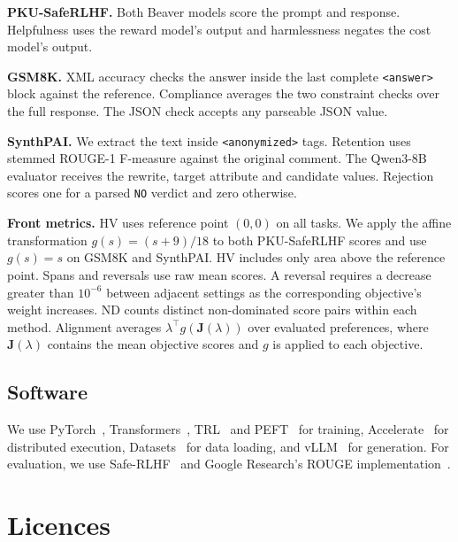 \documentclass{article} %
\begin{document}
\textbf{PKU-SafeRLHF.} Both Beaver models score the prompt and response. Helpfulness uses the reward model's output and harmlessness negates the cost model's output.

\textbf{GSM8K.} XML accuracy checks the answer inside the last complete \texttt{<answer>} block against the reference. Compliance averages the two constraint checks over the full response. The JSON check accepts any parseable JSON value.

\textbf{SynthPAI.} We extract the text inside \texttt{<anonymized>} tags. Retention uses stemmed ROUGE-1 F-measure against the original comment. The Qwen3-8B evaluator receives the rewrite, target attribute and candidate values. Rejection scores one for a parsed \texttt{NO} verdict and zero otherwise. 

\textbf{Front metrics.} HV uses reference point $(0,0)$ on all tasks. We apply the affine transformation $g(s)=(s+9)/18$ to both PKU-SafeRLHF scores and use $g(s)=s$ on GSM8K and SynthPAI. HV includes only area above the reference point. Spans and reversals use raw mean scores. A reversal requires a decrease greater than $10^{-6}$ between adjacent settings as the corresponding objective's weight increases. ND counts distinct non-dominated score pairs within each method. Alignment averages $\lambda^\top g(\mathbf{J}(\lambda))$ over evaluated preferences, where $\mathbf{J}(\lambda)$ contains the mean objective scores and $g$ is applied to each objective.

\subsection{Software}
\label{app:software}

We use PyTorch~\citep{paszke2019pytorch}, Transformers~\citep{wolf2019huggingface}, TRL~\citep{vonwerra2022trl} and PEFT~\citep{peft} for training, Accelerate~\citep{accelerate} for distributed execution, Datasets~\citep{lhoest-etal-2021-datasets} for data loading, and vLLM~\citep{kwon2023efficient} for generation. For evaluation, we use Safe-RLHF~\citep{dai2024saferlhf} and Google Research's ROUGE implementation~\citep{lin2004rouge}.


\section{Licences}
\label{app:licenses}
\end{document}
